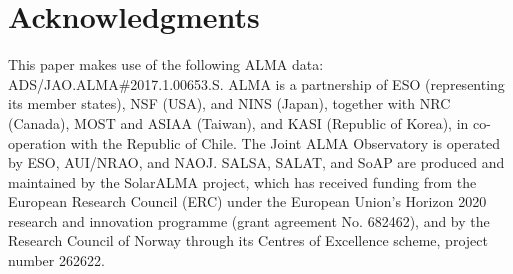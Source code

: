 \documentclass[a4paper,alpha-refs]{eSpectra}
\begin{document}

\section*{Acknowledgments}
This paper makes use of the following ALMA data: ADS/JAO.ALMA\#2017.1.00653.S. ALMA is a partnership of ESO (representing its member states), NSF (USA), and NINS (Japan), together with NRC (Canada), MOST and ASIAA (Taiwan), and KASI (Republic of Korea), in co-operation with the Republic of Chile. The Joint ALMA Observatory is operated by ESO, AUI/NRAO, and NAOJ. SALSA, SALAT, and SoAP are produced and maintained by the SolarALMA project, which has received funding from the European Research Council (ERC) under the European Union's Horizon 2020 research and innovation programme (grant agreement No. 682462), and by the Research Council of Norway through its Centres of Excellence scheme, project number 262622.






\end{document}

